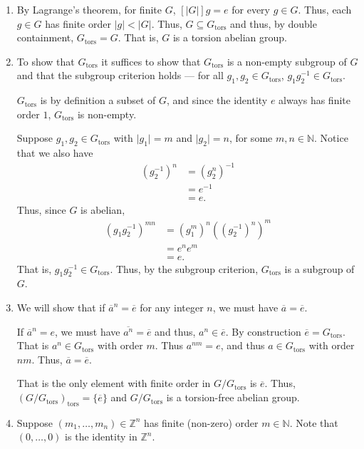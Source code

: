 \documentclass[12 pt, letterpaper]{hmcpset}
\begin{document}
\begin{solution}
	\begin{enumerate}
		\item By Lagrange's theorem, for finite $G$, $[\lvert G \rvert] g = e$ for every $g \in G$. Thus, each $g \in G$ has finite order $\lvert g \rvert < \lvert G \rvert$. Thus, $G \subseteq G_{\text{tors}}$ and thus, by double containment, $G_{\text{tors}} = G$. That is, $G$ is a torsion abelian group.
		\item To show that $G_{\text{tors}}$ it suffices to show that $G_{\text{tors}}$ is a non-empty subgroup of $G$ and that the subgroup criterion holds --- for all $g_{1}, g_{2} \in G_{\text{tors}}$, $g_{1} g_{2}^{-1} \in G_{\text{tors}}$.

			 $G_{\text{tors}}$ is by definition a subset of $G$, and since the identity $e$ always has finite order $1$, $G_{\text{tors}}$ is non-empty.

			 Suppose $g_{1}, g_{2} \in G_{\text{tors}}$ with $\lvert g_{1} \rvert = m$ and $\lvert g_{2} \rvert = n$, for some $m, n \in \mathbb{N}$. Notice that we also have 
			 \[
				 \begin{split}
					 (g_{2}^{-1})^{n} & = (g_{2}^{n})^{-1} \\
							  & = e^{-1} \\
							  & = e.
				 \end{split}
			 \]
			 Thus, since $G$ is abelian,
			 \[
				 \begin{split}
					 (g_{1} g_{2}^{-1})^{mn} & = (g_{1}^{m})^{n} ((g_{2}^{-1})^{n})^{m} \\
								 & = e^{n} e^{m} \\
								 & = e.
				 \end{split}
			 \]
			 That is, $g_{1} g_{2}^{-1} \in G_{\text{tors}}$. Thus, by the subgroup criterion, $G_{\text{tors}}$ is a subgroup of $G$.
		\item We will show that if $\overline{a}^{n} = \overline{e}$ for any integer $n$, we must have $\overline{a} = \overline{e}$.

			If $\overline{a}^{n} = e$, we must have $\overline{a^{n}} = \overline{e}$ and thus, $a^{n} \in \overline{e}$. By construction $\overline{e} = G_{\text{tors}}$. That is $a^{n} \in G_{\text{tors}}$ with order $m$. Thus $a^{nm} = e$, and thus $a \in G_{\text{tors}}$ with order $nm$. Thus, $\overline{a} = \overline{e}$.

			That is the only element with finite order in $G / G_{\text{tors}}$ is $\overline{e}$. Thus, $(G / G_{\text{tors}})_{\text{tors}} = \{ \overline{e} \}$ and $G / G_{\text{tors}}$ is a torsion-free abelian group.
		\item Suppose $(m_{1}, \dots, m_{n}) \in \mathbb{Z}^{n}$ has finite (non-zero) order $m \in \mathbb{N}$. Note that $(0, \dots, 0)$ is the identity in $\mathbb{Z}^{n}$.


\end{enumerate}
\end{solution}
\end{document}

